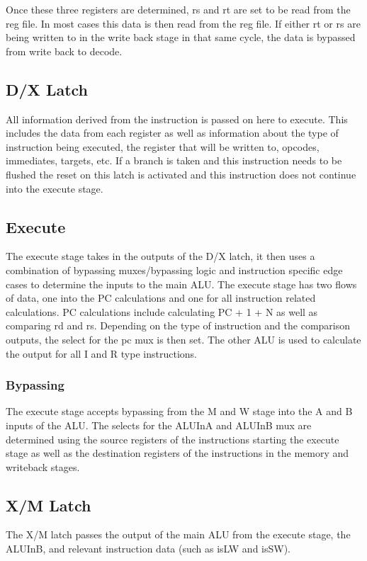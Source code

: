 \documentclass{article}
\begin{document}
Once these three registers are determined, rs and rt are set to be read from the reg file. In most cases this data is then read from the reg file. If either rt or rs are being written to in the write back stage in that same cycle, the data is bypassed from write back to decode. 

\subsection{D/X Latch}

All information derived from the instruction is passed on here to execute. This includes the data from each register as well as information about the type of instruction being executed, the register that will be written to, opcodes, immediates, targets, etc. If a branch is taken and this instruction needs to be flushed the reset on this latch is activated and this instruction does not continue into the execute stage. 

\subsection{Execute}
The execute stage takes in the outputs of the D/X latch, it then uses a combination of bypassing muxes/bypassing logic and instruction specific edge cases to determine the inputs to the main ALU. The execute stage has two flows of data, one into the PC calculations and one for all instruction related calculations. PC calculations include calculating PC + 1 + N as well as comparing rd and rs. Depending on the type of instruction and the comparison outputs, the select for the pc mux is then set. The other ALU is used to calculate the output for all I and R type instructions.

\subsubsection{Bypassing}
The execute stage accepts bypassing from the M and W stage into the A and B inputs of the ALU. The selects for the ALUInA and ALUInB mux are determined using the source registers of the instructions starting the execute stage as well as the destination registers of the instructions in the memory and writeback stages.

\subsection{X/M Latch}
The X/M latch passes the output of the main ALU from the execute stage, the ALUInB, and relevant instruction data (such as isLW and isSW).
\end{document}
